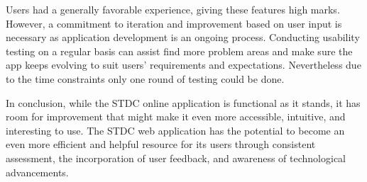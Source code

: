 \begin{justify}
\vspace{0.25cm}
\newendline Users had a generally favorable experience, giving these features high marks. However, a commitment to iteration and improvement based on user input is necessary as application development is an ongoing process. Conducting usability testing on a regular basis can assist find more problem areas and make sure the app keeps evolving to suit users' requirements and expectations. Nevertheless due to the time constraints only one round of testing could be done.

\vspace{0.25cm}
\newendline In conclusion, while the STDC online application is functional as it stands, it has room for improvement that might make it even more accessible, intuitive, and interesting to use. The STDC web application has the potential to become an even more efficient and helpful resource for its users through consistent assessment, the incorporation of user feedback, and awareness of technological advancements.


\end{justify}
\clearpage




\vspace{0.25cm}
